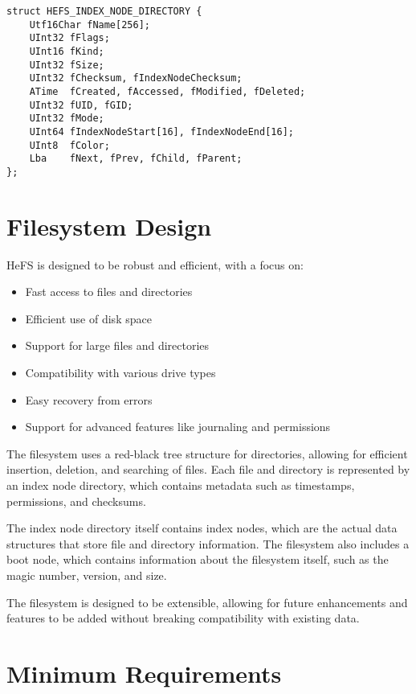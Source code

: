 \documentclass{article}
\begin{document}
\begin{lstlisting}[style=cstyle, caption={HEFS\_INDEX\_NODE\_DIRECTORY structure}]
struct HEFS_INDEX_NODE_DIRECTORY {
    Utf16Char fName[256];
    UInt32 fFlags;
    UInt16 fKind;
    UInt32 fSize;
    UInt32 fChecksum, fIndexNodeChecksum;
    ATime  fCreated, fAccessed, fModified, fDeleted;
    UInt32 fUID, fGID;
    UInt32 fMode;
    UInt64 fIndexNodeStart[16], fIndexNodeEnd[16];
    UInt8  fColor;
    Lba    fNext, fPrev, fChild, fParent;
};
\end{lstlisting}

\section{Filesystem Design}

HeFS is designed to be robust and efficient, with a focus on:
\begin{itemize}
    \item Fast access to files and directories
    \item Efficient use of disk space
    \item Support for large files and directories
    \item Compatibility with various drive types
    \item Easy recovery from errors
    \item Support for advanced features like journaling and permissions
\end{itemize}

The filesystem uses a red-black tree structure for directories, allowing for efficient insertion, deletion, and searching of files. 
Each file and directory is represented by an index node directory, which contains metadata such as timestamps, permissions, and checksums.

The index node directory itself contains index nodes, which are the actual data structures that store file and directory information.
The filesystem also includes a boot node, which contains information about the filesystem itself, such as the magic number, version, and size.

The filesystem is designed to be extensible, allowing for future enhancements and features to be added without breaking compatibility with existing data.

\section{Minimum Requirements}
\end{document}
